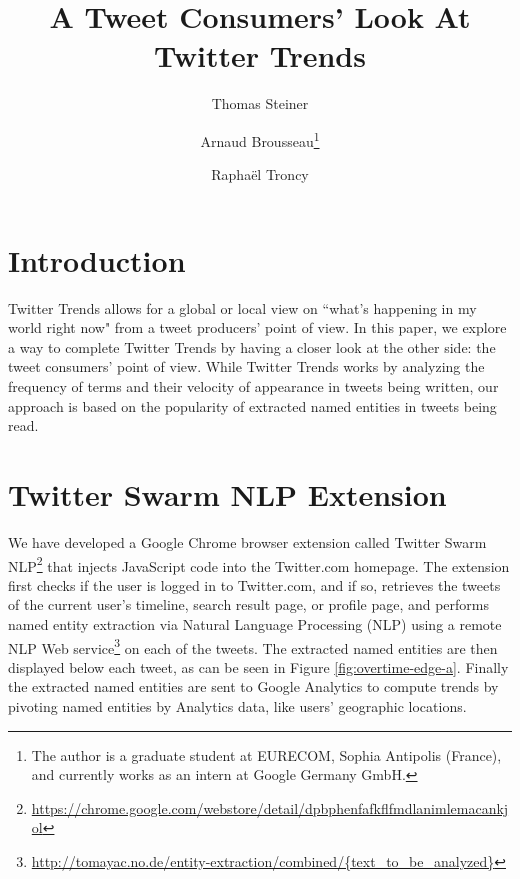 \documentclass[runningheads,a4paper]{llncs}
\begin{document}
\mainmatter  %

\title{A Tweet Consumers' Look At Twitter Trends}


\author{Thomas Steiner \and Arnaud Brousseau\thanks{The author is a graduate student at EURECOM, Sophia Antipolis (France), and currently works as an intern at Google Germany GmbH.} \and Rapha\"{e}l Troncy}


\maketitle

\section{Introduction}\label{sec:introduction}
Twitter Trends allows for a global or local view on ``what's happening in my world right now" from a tweet producers' point of view. In this paper, we explore a way to complete Twitter Trends by having a closer look at the other side: the tweet consumers' point of view. While Twitter Trends works by analyzing the frequency of terms and their velocity of appearance in tweets being written, our approach is based on the popularity of extracted named entities in tweets being read.
 
\section{Twitter Swarm NLP Extension}\label{sec:twitterswarm}
We have developed a Google Chrome browser extension called Twitter Swarm NLP\footnote{\url{https://chrome.google.com/webstore/detail/dpbphenfafkflfmdlanimlemacankjol}} that injects JavaScript code into the Twitter.com homepage. The extension first checks if the user is logged in to Twitter.com, and if so, retrieves the tweets of the current user's timeline, search result page, or profile page, and performs named entity extraction via Natural Language Processing (NLP) using a remote NLP Web service\footnote{\url{http://tomayac.no.de/entity-extraction/combined/{text_to_be_analyzed}}} on each of the tweets. The extracted named entities are then displayed below each tweet, as can be seen in Figure \ref{fig:overtime-edge-a}. Finally the extracted named entities are sent to Google Analytics to compute trends by pivoting named entities by Analytics data, like users' geographic locations.
\end{document}

